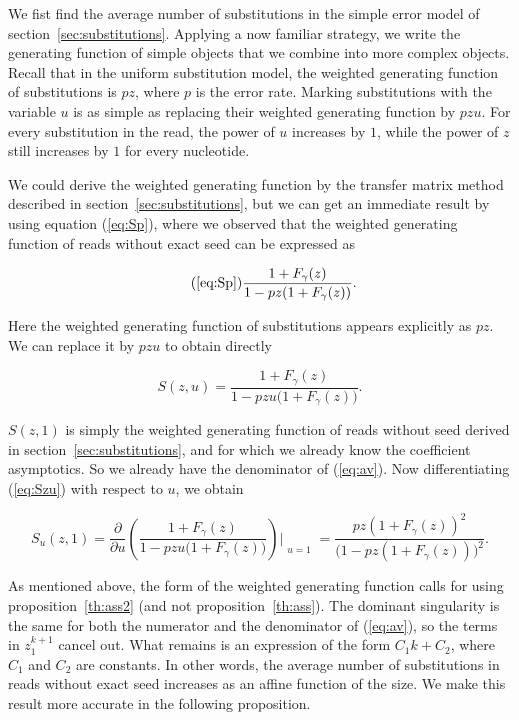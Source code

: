 \documentclass{article}
\begin{document}
We fist find the average number of substitutions in the simple error model
of section~\ref{sec:substitutions}. Applying a now familiar strategy, we
write the generating function of simple objects that we combine into more
complex objects. Recall that in the uniform substitution model, the
weighted generating function of substitutions is $pz$, where $p$ is the
error rate. Marking substitutions with the variable $u$ is as simple as
replacing their weighted generating function by $pzu$. For every
substitution in the read, the power of $u$ increases by $1$, while the
power of $z$ still increases by $1$ for every nucleotide.

We could derive the weighted generating function by the transfer matrix
method described in section~\ref{sec:substitutions}, but we can get an
immediate result by using equation (\ref{eq:Sp}), where we observed
that the weighted generating function of reads without exact seed can
be expressed as

\begin{equation}
\tag{\ref{eq:Sp}}
\frac{1+F_\gamma(z)}{1-pz(1+F_\gamma(z))}.
\end{equation}

Here the weighted generating function of substitutions appears explicitly
as $pz$. We can replace it by $pzu$ to obtain directly

\begin{equation}
\label{eq:Szu}
S(z,u) = \frac{1+F_\gamma(z)}{1-pzu\big( 1+F_\gamma(z) \big)}.
\end{equation}


$S(z,1)$ is simply the weighted generating function of reads without seed
derived in section~\ref{sec:substitutions}, and for which we already know
the coefficient asymptotics. So we already have the denominator of
(\ref{eq:av}). Now differentiating (\ref{eq:Szu}) with respect to $u$, we
obtain

\begin{equation}
\label{eq:dSdu}
S_u(z,1) = \frac{\partial }{\partial u}
\left(\frac{1+F_\gamma(z)}{1-pzu\big( 1+F_\gamma(z) \big)}
\right) \Biggr|_{\substack{\\u=1}} = 
\frac{pz(1+F_\gamma(z))^2}{\big( 1 - pz(1+F_\gamma(z)) \big)^2}.
\end{equation}

As mentioned above, the form of the weighted generating function calls for
using proposition~\ref{th:ass2} (and not proposition~\ref{th:ass}). The
dominant singularity is the same for both the numerator and the
denominator of (\ref{eq:av}), so the terms in $z_1^{k+1}$ cancel out. What
remains is an expression of the form $C_1k + C_2$, where $C_1$ and $C_2$
are constants. In other words, the average number of substitutions in
reads without exact seed increases as an affine function of the size. We
make this result more accurate in the following proposition.
\end{document}

